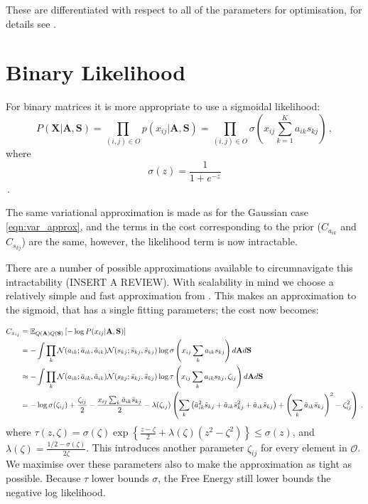 \documentclass{article}
\newcommand{\obs}{O}
\newcommand{\X}{\mathbf{X}}
\newcommand{\A}{\mathbf{A}}
\newcommand{\s}{\mathbf{S}}
\newcommand{\N}{\mathcal{N}}
\newcommand{\atil}{\tilde{a}}
\newcommand{\abar}{\bar{a}}
\newcommand{\stil}{\tilde{s}}
\newcommand{\sbar}{\bar{s}}
\newcommand{\E}{\mathbb{E}}
\begin{document}
These are differentiated with respect to all of the parameters for optimisation, for details see \citep{raiko2007}.

\section{Binary Likelihood} \label{sec:sigmoid}
For binary matrices it is more appropriate to use a sigmoidal likelihood:
\begin{equation}
P(\X|\A,\s) = \prod_{(i,j)\in\obs} p(x_{ij}|\A,\s) = \prod_{(i,j)\in\obs} \sigma \left(x_{ij}\sum_{k=1}^K a_{ik}s_{kj}\right)\,,
\end{equation}
where $$\sigma(z) = \frac{1}{1+e^{-z}}$$\,.

The same variational approximation is made as for the Gaussian case \eqref{eqn:var_approx}, and the terms in the cost corresponding to the prior ($C_{a_{ik}}$ and $C_{s_{kj}}$) are the same,
however, the likelihood term is now intractable.

There are a number of possible approximations available to circumnavigate this intractability (INSERT A REVIEW). With scalability in mind we choose a relatively simple and fast approximation
from \citep{jaakkola1997}. This makes an approximation to the sigmoid, that has a single fitting parameters; the cost now becomes:

\begin{align}
C_{x_{ij}} &= \E_{Q(\A)Q(\s)}\left[-\log P(x_{ij}|\A,\s) \right] \notag\\
&=-\int\prod_k\N(a_{ik};\abar_{ik},\atil_{ik})\N(s_{kj};\sbar_{kj},\stil_{kj})\log\sigma\left(x_{ij}\sum_{k}a_{ik}s_{kj}\right) d \A d \s \notag\\
&\approx-\int\prod_k\N(a_{ik};\abar_{ik},\atil_{ik})\N(s_{kj};\sbar_{kj},\stil_{kj})\log\tau\left(x_{ij}\sum_{k}a_{ik}s_{kj},\zeta_{ij}\right) d \A d \s \notag\\
&=-\log\sigma(\zeta_{ij})+\frac{\zeta_{ij}}{2}-\frac{x_{ij}\sum_k\abar_{ik}\sbar_{kj}}{2}-\lambda(\zeta_{ij})\left(
\sum_k\left(\abar_{ik}^2\stil_{kj}+\atil_{ik}\sbar^2_{kj}+\atil_{ik}\stil_{kj}\right)+\left(\sum_{k}\abar_{ik}\sbar_{kj}\right)^2-\zeta_{ij}^2\right)\,.
\label{eqn:lik_sigmoid}
\end{align}  
where $\tau(z,\zeta) = \sigma(\zeta)\exp\left\{\frac{z-\zeta}{2}+\lambda(\zeta)\left(z^2-\zeta^2\right) \right\}\leq \sigma(z)$,
and $\lambda(\zeta)=\frac{1/2-\sigma(\zeta)}{2\zeta}$.
This introduces another parameter $\zeta_{ij}$ for every element in $\mathcal{O}$. 
We maximise over these parameters also to make the approximation as tight as possible. 
Because $\tau$ lower bounds $\sigma$, the Free Energy still lower bounds the negative log likelihood.
\end{document}
